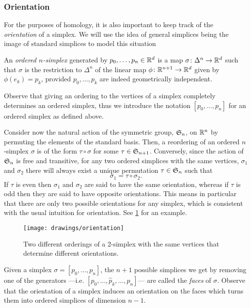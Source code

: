 \documentclass[../main.tex]{subfiles}
\begin{document}
\subsubsection{Orientation}
For the purposes of homology, it is also important to keep track of the \emph{orientation} of a
simplex. We will use the idea of general simplices being the image of standard simplices
to model this situation
\begin{definition}
	An \emph{ordered \( n \)-simplex} generated by \( p_0, \dots, p_n \in \R^d \) is a map
	\( \sigma \colon \Delta^n \to \R^d \) such that \( \sigma \) is the restriction to \(
	\Delta^n \) of the linear map \( \phi \colon \R^{n+1} \to \R^d \) given by \( \phi(e_k)
	= p_k \), provided \( p_0, \dots, p_k \) are indeed geometrically independent. 
\end{definition}
Observe that giving an ordering to the vertices of a simplex completely determines an
ordered simplex, thus we introduce the notation \( [p_0, \dots, p_n] \) for an ordered
simplex as defined above. 

Consider now the natural action of the symmetric group, \( \S_n \), on \( \R^n \) by
permuting the elements of the standard basis. Then, a reordering of an ordered \( n
\)-simplex \( \sigma \) is of the form \( \tau \circ \sigma \) for some \( \tau \in
\S_{n+1} \). Conversely, since the action of \( \S_n \) is free and transitive, for any
two ordered simplices with the same vertices,  \( \sigma_1 \) and \( \sigma_2 \) there
will always exist a unique permutation \( \tau \in \S_n \) such that
\begin{equation*}
	\sigma_1 = \tau \circ \sigma_2.
\end{equation*}
If \( \tau \) is even then \( \sigma_1 \) and \( \sigma_2 \) are said to have the same
orientation, whereas if \( \tau \) is odd then they are said to have opposite
orientations. This means in particular that there are only two possible orientations for
any simplex, which is consistent with the usual intuition for orientation. See
\cref{fig:orientation} for an example. 

\begin{figure}[htb]
	\centering
	\texttt{[image: drawings/orientation]}
	\caption{Two different orderings of a 2-simplex with the same vertices that determine
	different orientations.}
	\label{fig:orientation}
\end{figure}

Given a simplex \( \sigma = [p_0, \dots, p_n] \), the \( n+1 \) possible simplices we get by
removing one of the generators ---i.e. \( [p_0, \dots, \hat{p}_k, \dots, p_n] \)--- are
called the \emph{faces} of \( \sigma \). Observe that the orientation of a simplex induces
an orientation on the faces which turns them into ordered simplices of dimension \( n-1
\).
\end{document}
